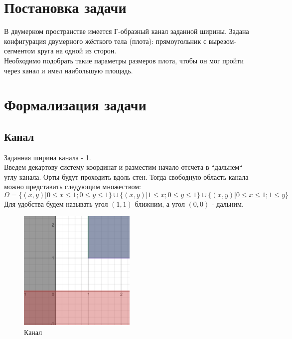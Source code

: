 
\usepackage{amsmath}




\renewcommand\contentsname{\centerline{Содержание}}
\tableofcontents
\newpage

\listoffigures

\newpage



\section{Постановка задачи}
В двумерном пространстве имеется Г-образный канал заданной ширины. Задана конфигурация двумерного жёсткого тела (плота): прямоугольник с вырезом-сегментом круга на одной из сторон. \\
Необходимо подобрать такие параметры размеров плота, чтобы он мог пройти через канал и имел наибольшую площадь.


\section{Формализация задачи}
\subsection{Канал}
Заданная ширина канала - 1. \\

Введем декартову систему координат и разместим начало отсчета в ``дальнем`` углу канала. Орты будут проходить вдоль стен. Тогда свободную область канала можно представить следующим множеством:\\
\begin{equation}
\Omega=\{(x,y) | 0\leq x \leq 1 ; 0\leq y \leq 1\} \cup \{(x,y) | 1 \leq x ; 0\leq y \leq 1\} \cup \{(x,y) | 0\leq x \leq 1 ; 1 \leq y \}
\end{equation}
Для удобства будем называть угол $(1,1)$ ближним, а угол $(0,0)$ - дальним.

\begin{figure}[!htb]
    \centering
    \includegraphics[width=0.5\textwidth]{fig/corridor.png}
    \caption{Канал}
\end{figure}


